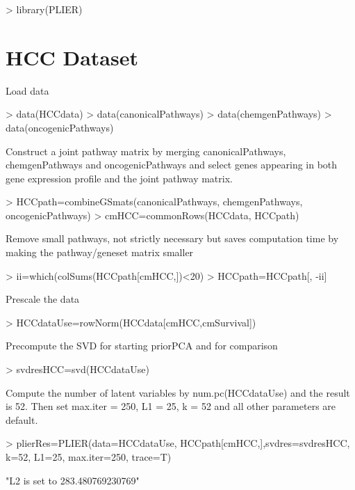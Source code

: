 \documentclass{article}
\begin{document}

\begin{Schunk}
\begin{Sinput}
> library(PLIER)
\end{Sinput}
\end{Schunk}
\section{HCC Dataset}
Load data
\begin{Schunk}
\begin{Sinput}
> data(HCCdata)
> data(canonicalPathways)
> data(chemgenPathways)
> data(oncogenicPathways)
\end{Sinput}
\end{Schunk}
Construct a joint pathway matrix by merging canonicalPathways, chemgenPathways and oncogenicPathways and select genes appearing in both gene expression profile and the joint pathway matrix.
\begin{Schunk}
\begin{Sinput}
> HCCpath=combineGSmats(canonicalPathways, chemgenPathways, oncogenicPathways)
> cmHCC=commonRows(HCCdata, HCCpath)
\end{Sinput}
\end{Schunk}
Remove small pathways, not strictly necessary but saves computation time by making the pathway/geneset matrix smaller
\begin{Schunk}
\begin{Sinput}
> ii=which(colSums(HCCpath[cmHCC,])<20)
> HCCpath=HCCpath[, -ii]
\end{Sinput}
\end{Schunk}
Prescale the data
\begin{Schunk}
\begin{Sinput}
> HCCdataUse=rowNorm(HCCdata[cmHCC,cmSurvival])
\end{Sinput}
\end{Schunk}
Precompute the SVD for starting priorPCA and for comparison
\begin{Schunk}
\begin{Sinput}
> svdresHCC=svd(HCCdataUse)
\end{Sinput}
\end{Schunk}
Compute the number of latent variables by num.pc(HCCdataUse) and the result is 52. Then set max.iter = 250, L1 = 25, k = 52 and all other parameters are default.
\begin{Schunk}
\begin{Sinput}
> plierRes=PLIER(data=HCCdataUse, HCCpath[cmHCC,],svdres=svdresHCC, k=52, L1=25, max.iter=250, trace=T)
\end{Sinput}
\begin{Soutput}
[1] "L2 is set to 283.480769230769"
\end{Soutput}
\end{Schunk}
\end{document}
